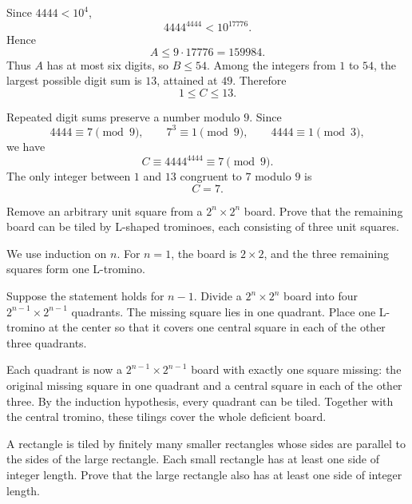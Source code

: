     \begin{solution}
        Since $4444<10^4$,
        \[
            4444^{4444}<10^{17776}.
        \]
        Hence
        \[
            A\leq9\cdot17776=159984.
        \]
        Thus $A$ has at most six digits, so $B\leq54$. Among the integers from
        $1$ to $54$, the largest possible digit sum is $13$, attained at $49$.
        Therefore
        \[
            1\leq C\leq13.
        \]

        Repeated digit sums preserve a number modulo $9$. Since
        \[
            4444\equiv7\pmod9,
            \qquad
            7^3\equiv1\pmod9,
            \qquad
            4444\equiv1\pmod3,
        \]
        we have
        \[
            C\equiv4444^{4444}\equiv7\pmod9.
        \]
        The only integer between $1$ and $13$ congruent to $7$ modulo $9$ is
        \[
            \boxed{C=7}.
        \]
    \end{solution}

    \begin{expectedproblem}
        Remove an arbitrary unit square from a $2^n\times2^n$ board. Prove that
        the remaining board can be tiled by L-shaped trominoes, each consisting
        of three unit squares.
    \end{expectedproblem}

    \begin{solution}
        We use induction on $n$. For $n=1$, the board is $2\times2$, and the
        three remaining squares form one L-tromino.

        Suppose the statement holds for $n-1$. Divide a $2^n\times2^n$ board
        into four $2^{n-1}\times2^{n-1}$ quadrants. The missing square lies in
        one quadrant. Place one L-tromino at the center so that it covers one
        central square in each of the other three quadrants.

        Each quadrant is now a $2^{n-1}\times2^{n-1}$ board with exactly one
        square missing: the original missing square in one quadrant and a
        central square in each of the other three. By the induction hypothesis,
        every quadrant can be tiled. Together with the central tromino, these
        tilings cover the whole deficient board.
    \end{solution}

    \begin{expectedproblem}
        A rectangle is tiled by finitely many smaller rectangles whose sides
        are parallel to the sides of the large rectangle. Each small rectangle
        has at least one side of integer length. Prove that the large rectangle
        also has at least one side of integer length.
    \end{expectedproblem}

